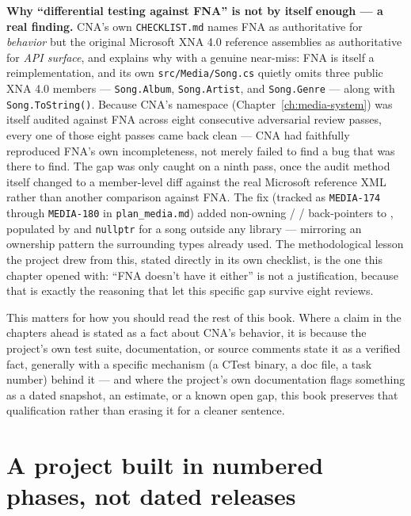 \begin{sourcenote}
\textbf{Why ``differential testing against FNA'' is not by itself enough --- a real finding.}
CNA's own \texttt{CHECKLIST.md} names FNA as authoritative for \emph{behavior} but the original
Microsoft XNA 4.0 reference assemblies as authoritative for \emph{API surface}, and explains why
with a genuine near-miss: FNA is itself a reimplementation, and its own \texttt{src/Media/Song.cs}
quietly omits three public XNA 4.0 members --- \texttt{Song.Album}, \texttt{Song.Artist}, and
\texttt{Song.Genre} --- along with \texttt{Song.ToString()}. Because CNA's  namespace
(Chapter~\ref{ch:media-system}) was itself audited against FNA across eight consecutive
adversarial review passes, every one of those eight passes came back clean --- CNA had faithfully
reproduced FNA's own incompleteness, not merely failed to find a bug that was there to find. The
gap was only caught on a ninth pass, once the audit method itself changed to a member-level diff
against the real Microsoft reference XML rather than another comparison against FNA. The fix
(tracked as \texttt{MEDIA-174} through \texttt{MEDIA-180} in \texttt{plan\_media.md}) added
non-owning  /  /  back-pointers to ,
populated by  and \texttt{nullptr} for a song outside any library ---
mirroring an ownership pattern the surrounding  types already used. The methodological
lesson the project drew from this, stated directly in its own checklist, is the one this chapter
opened with: ``FNA doesn't have it either'' is not a justification, because that is exactly the
reasoning that let this specific gap survive eight reviews.
\end{sourcenote}

This matters for how you should read the rest of this book. Where a claim in the chapters
ahead is stated as a fact about CNA's behavior, it is because the project's own test suite,
documentation, or source comments state it as a verified fact, generally with a specific
mechanism (a CTest binary, a doc file, a task number) behind it --- and where the project's
own documentation flags something as a dated snapshot, an estimate, or a known open gap, this
book preserves that qualification rather than erasing it for a cleaner sentence.

\section{A project built in numbered phases, not dated releases}

